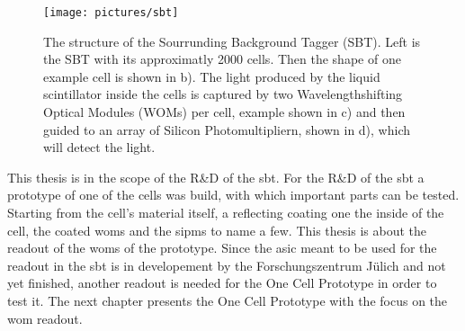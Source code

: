 \begin{figure}
	\centering
	\texttt{[image: pictures/sbt]}
	\caption[Overview of the Sourrunding Background Tagger]{The structure of the Sourrunding Background Tagger (SBT). Left is the SBT with its approximatly 2000 cells. Then the shape of one example cell is shown in b). The light produced by the liquid scintillator inside the cells is captured by two Wavelengthshifting Optical Modules (WOMs) per cell, example shown in c) and then guided to an array of Silicon Photomultipliern, shown in d), which will detect the light.}
	\label{fig:sbt}
\end{figure}

This thesis is in the scope of the R\&D of the \ac{sbt}.
For the R\&D of the \ac{sbt} a prototype of one of the cells was build, with which important parts can be tested.
Starting from the cell's material itself, a reflecting coating one the inside of the cell, the coated \acp{wom} and the \acp{sipm} to name a few.
This thesis is about the readout of the \acp{wom} of the prototype.
Since the \ac{asic} meant to be used for the readout in the \ac{sbt} is in developement by the Forschungszentrum Jülich and not yet finished, another readout is needed for the One Cell Prototype in order to test it.
The next chapter presents the One Cell Prototype with the focus on the \ac{wom} readout.
